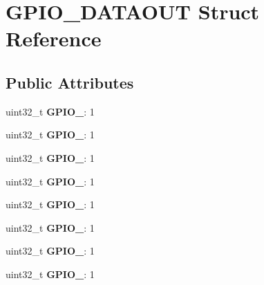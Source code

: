 \hypertarget{structGPIO__DATAOUT}{\section{G\-P\-I\-O\-\_\-\-D\-A\-T\-A\-O\-U\-T Struct Reference}
\label{structGPIO__DATAOUT}
}
\subsection*{Public Attributes}
\begin{DoxyCompactItemize}
\item 
\hypertarget{structGPIO__DATAOUT_a7fc06a1d9c7bcb6c2a04afae0c30b068}{uint32\-\_\-t {\bfseries G\-P\-I\-O\-\_}\-: 1}\label{structGPIO__DATAOUT_a7fc06a1d9c7bcb6c2a04afae0c30b068}

\item 
\hypertarget{structGPIO__DATAOUT_aeb6ce59c94513f1c3fad18cb2ac9e65e}{uint32\-\_\-t {\bfseries G\-P\-I\-O\-\_}\-: 1}\label{structGPIO__DATAOUT_aeb6ce59c94513f1c3fad18cb2ac9e65e}

\item 
\hypertarget{structGPIO__DATAOUT_ad483dca61cd6fb8a3d667668a246d772}{uint32\-\_\-t {\bfseries G\-P\-I\-O\-\_}\-: 1}\label{structGPIO__DATAOUT_ad483dca61cd6fb8a3d667668a246d772}

\item 
\hypertarget{structGPIO__DATAOUT_a8a99c70fc657f715659ee6a3673d9e03}{uint32\-\_\-t {\bfseries G\-P\-I\-O\-\_}\-: 1}\label{structGPIO__DATAOUT_a8a99c70fc657f715659ee6a3673d9e03}

\item 
\hypertarget{structGPIO__DATAOUT_aa14767aaf9f83e9f4a93734203deeeda}{uint32\-\_\-t {\bfseries G\-P\-I\-O\-\_}\-: 1}\label{structGPIO__DATAOUT_aa14767aaf9f83e9f4a93734203deeeda}

\item 
\hypertarget{structGPIO__DATAOUT_a0e8adb52470f186550e9d6c2bec0d054}{uint32\-\_\-t {\bfseries G\-P\-I\-O\-\_}\-: 1}\label{structGPIO__DATAOUT_a0e8adb52470f186550e9d6c2bec0d054}

\item 
\hypertarget{structGPIO__DATAOUT_ae415ae976f06e5e9f749c880eec15407}{uint32\-\_\-t {\bfseries G\-P\-I\-O\-\_}\-: 1}\label{structGPIO__DATAOUT_ae415ae976f06e5e9f749c880eec15407}

\item 
\hypertarget{structGPIO__DATAOUT_a10f2beaf18459e9f19f373f672c1e857}{uint32\-\_\-t {\bfseries G\-P\-I\-O\-\_}\-: 1}\label{structGPIO__DATAOUT_a10f2beaf18459e9f19f373f672c1e857}


\end{DoxyCompactItemize}
